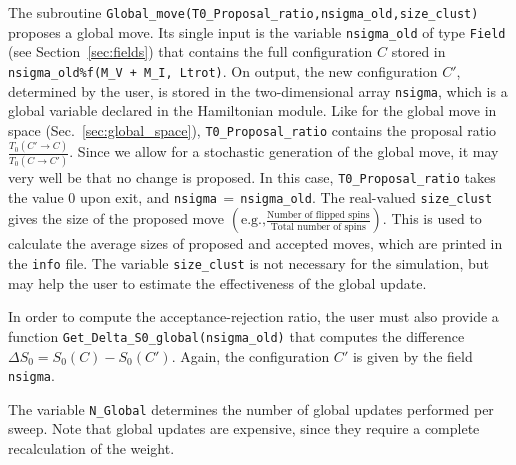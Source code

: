 The subroutine  \texttt{Global\_move(T0\_Proposal\_ratio,nsigma\_old,size\_clust)}  proposes  a global move. 
Its single input is the variable \texttt{nsigma\_old} of type \texttt{Field} (see Section~\ref{sec:fields}) that contains  the full  configuration $C$ stored in \texttt{nsigma\_old\%f(M\_V + M\_I, Ltrot)}.  On output, the new configuration $C'$, determined by the user,  is stored in the two-dimensional array \texttt{nsigma}, which is a global variable declared in the Hamiltonian module.
Like for the global move in space (Sec.~\ref{sec:global_space}), \texttt{T0\_Proposal\_ratio} contains the proposal ratio $\frac{T_0(C' \rightarrow C)}{T_0(C \rightarrow C')} $.
Since we allow for a stochastic  generation of  the global move, it may very well be that no change is proposed. In this case, \texttt{T0\_Proposal\_ratio}   takes the value 0 upon exit, and  \texttt{nsigma$\,=\,$nsigma\_old}.   
The real-valued \texttt{size\_clust} gives the size of the proposed move $\left(\text{e.g.,} \tfrac{\text{Number of flipped spins}}{\text{Total number of spins}}\right)$. This is used to calculate the average sizes of proposed and accepted moves, which are printed in the \texttt{info} file. The variable \texttt{size\_clust} is not necessary for the simulation, but may help the user to estimate the effectiveness of the global update.

In order to compute the acceptance-rejection ratio,  the user must also provide a function 
\texttt{Get\_\-Delta\_\-S0}\texttt{\_\-global(nsigma\_old)} that computes the difference $\Delta S_0=S_0(C)-S_0(C')$. Again, the configuration $C'$ is given by the field \texttt{nsigma}.

The variable \texttt{N\_Global} determines the number of global updates performed per sweep. Note that global updates are expensive, since they require a complete recalculation of the weight.
% 

